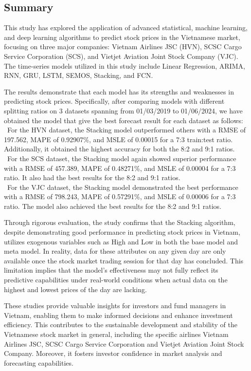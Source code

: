 \documentclass{ieeeojies}
\begin{document}
\subsection{Summary}
This study has explored the application of advanced statistical, machine learning, and deep learning algorithms to predict stock prices in the Vietnamese market, focusing on three major companies: Vietnam Airlines JSC (HVN), SCSC Cargo Service Corporation (SCS), and Vietjet Aviation Joint Stock Company (VJC). The time-series models utilized in this study include Linear Regression, ARIMA, RNN, GRU, LSTM, SEMOS, Stacking, and FCN.

The results demonstrate that each model has its strengths and weaknesses in predicting stock prices. Specifically,  after comparing models with different splitting ratios on 3 datasets spanning from 01/03/2019 to 01/06/2024, we have obtained the model that give the best forecast result for each dataset as follows: \\
\indent\textbullet\ For the HVN dataset, the Stacking model outperformed others with a RMSE of 197.562, MAPE of 0.92907\%, and MSLE of 0.00015 for a 7:3 train:test ratio. Additionally, it obtained the highest accuracy for both the 8:2 and 9:1 ratios.\\
\indent\textbullet\ For the SCS dataset, the Stacking model again showed superior performance with a RMSE of 457.389, MAPE of 0.48271\%, and MSLE of 0.00004 for a 7:3 ratio. 
It also had the best results for the 8:2 and 9:1 ratios.\\
\indent\textbullet\ For the VJC dataset, the Stacking model demonstrated the best performance with a RMSE of 798.243, MAPE of 0.57291\%, and MSLE of 0.00006 for a 7:3 ratio. The model also achieved the best results for the 8:2 and 9:1 ratios.

Through rigorous evaluation, the study confirms that the Stacking algorithm, despite demonstrating good performance in predicting stock prices in Vietnam, utilizes exogenous variables such as High and Low in both the base model and meta model. In reality, data for these attributes on any given day are only available once the stock market trading session for that day has concluded. This limitation implies that the model's effectiveness may not fully reflect its predictive capabilities under real-world conditions when actual data on the highest and lowest prices of the day are lacking.

These studies provide valuable insights for investors and fund managers in Vietnam, enabling them to make informed decisions and enhance investment efficiency. This contributes to the sustainable development and stability of the Vietnamese stock market in general, including the specific airlines Vietnam Airlines JSC, SCSC Cargo Service Corporation and Vietjet Aviation Joint Stock Company. Moreover, it fosters investor confidence in market analysis and forecasting capabilities.
\end{document}
